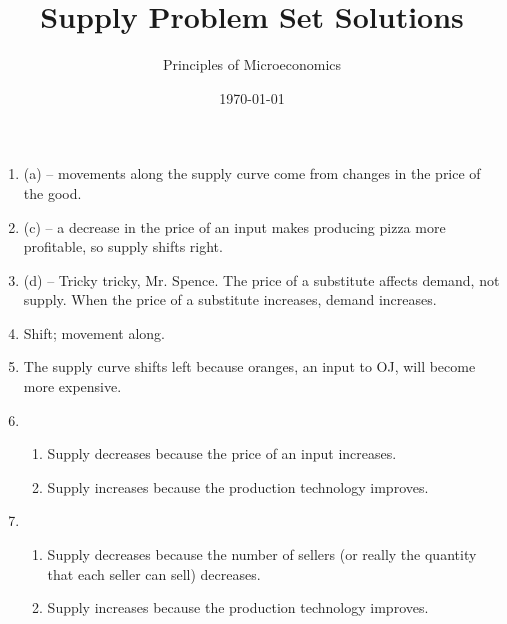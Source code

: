 \documentclass{article}
\title{Supply Problem Set Solutions}
\author{Principles of Microeconomics}
\date{\today}
\begin{document}
\maketitle

\begin{enumerate}

\item (a) -- movements along the supply curve come from changes in the price of the good.

\item (c) -- a decrease in the price of an input makes producing pizza more profitable, so supply shifts right.

\item (d) -- Tricky tricky, Mr. Spence. The price of a substitute affects demand, not supply. When the price of a substitute increases, demand increases.

\item Shift; movement along.

\item The supply curve shifts left because oranges, an input to OJ, will become more expensive. 

\item

	\begin{enumerate}
	
	\item Supply decreases because the price of an input increases.
	
	\item Supply increases because the production technology improves. 
	
	\end{enumerate}
	
\item

	\begin{enumerate}
	
	\item Supply decreases because the number of sellers (or really the quantity that each seller can sell) decreases. 
	
	\item Supply increases because the production technology improves. 
	
	\end{enumerate}

\end{enumerate}
\end{document}
